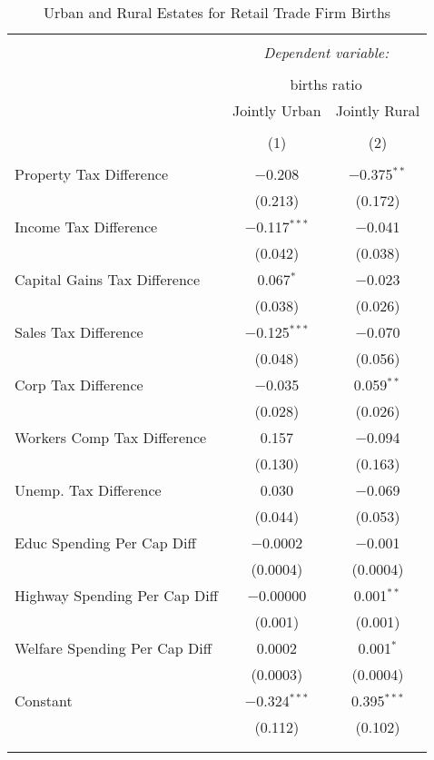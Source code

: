 
\begin{table}[!htbp] \centering 
  \caption{Urban and Rural Estates for  Retail Trade Firm Births} 
  \label{} 
\begin{tabular}{@{\extracolsep{5pt}}lcc} 
\\[-1.8ex]\hline 
\hline \\[-1.8ex] 
 & \multicolumn{2}{c}{\textit{Dependent variable:}} \\ 
\cline{2-3} 
\\[-1.8ex] & \multicolumn{2}{c}{births ratio} \\ 
 & Jointly Urban & Jointly Rural \\ 
\\[-1.8ex] & (1) & (2)\\ 
\hline \\[-1.8ex] 
 Property Tax Difference & $-$0.208 & $-$0.375$^{**}$ \\ 
  & (0.213) & (0.172) \\ 
  Income Tax Difference & $-$0.117$^{***}$ & $-$0.041 \\ 
  & (0.042) & (0.038) \\ 
  Capital Gains Tax Difference & 0.067$^{*}$ & $-$0.023 \\ 
  & (0.038) & (0.026) \\ 
  Sales Tax Difference & $-$0.125$^{***}$ & $-$0.070 \\ 
  & (0.048) & (0.056) \\ 
  Corp Tax Difference & $-$0.035 & 0.059$^{**}$ \\ 
  & (0.028) & (0.026) \\ 
  Workers Comp Tax Difference & 0.157 & $-$0.094 \\ 
  & (0.130) & (0.163) \\ 
  Unemp. Tax Difference & 0.030 & $-$0.069 \\ 
  & (0.044) & (0.053) \\ 
  Educ Spending Per Cap Diff & $-$0.0002 & $-$0.001 \\ 
  & (0.0004) & (0.0004) \\ 
  Highway Spending Per Cap Diff & $-$0.00000 & 0.001$^{**}$ \\ 
  & (0.001) & (0.001) \\ 
  Welfare Spending Per Cap Diff & 0.0002 & 0.001$^{*}$ \\ 
  & (0.0003) & (0.0004) \\ 
  Constant & $-$0.324$^{***}$ & 0.395$^{***}$ \\ 
  & (0.112) & (0.102) \\ 
 \hline \\[-1.8ex] 
\hline 
\hline \\[-1.8ex] 
\end{tabular} 
\end{table} 
